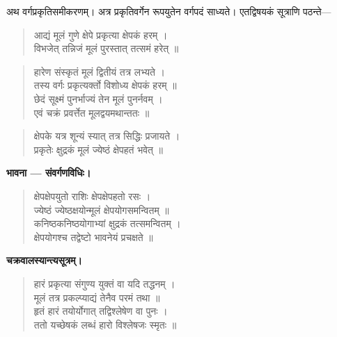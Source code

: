 \documentclass[11pt,a4paper]{article}
\newcommand{\dev}[1]{{\devanagarifont #1}}
\newcommand{\vs}{\vspace{0.5em}}
\newenvironment{sanskritverse}{%
  \begin{quote}\devanagarifont\textcolor{versecolor}%
}{%
  \end{quote}
}
\begin{document}
\lettrine[lines=3, lraise=0.1, nindent=0em, slope=-.5em]{\dev{अ}}{}थ वर्गप्रकृतिसमीकरणम्। अत्र प्रकृतिवर्गेन रूपयुतेन वर्गपदं साध्यते। एतद्विषयकं सूत्राणि पठन्ते---

\vs

\begin{sanskritverse}
\dev{आद्यं मूलं गुणे क्षेपे प्रकृत्या क्षेपकं हरम् ।}\\
\dev{विभजेत् तन्निजं मूलं पुरस्तात् तत्समं हरेत् ॥}
\end{sanskritverse}

\begin{sanskritverse}
\dev{हारेण संस्कृतं मूलं द्वितीयं तत्र लभ्यते ।}\\
\dev{तस्य वर्गः प्रकृत्यर्क्तो विशोध्य क्षेपकं हरम् ॥}\\
\dev{छेदं सूक्ष्मं पुनर्भाज्यं तेन मूलं पुनर्नवम् ।}\\
\dev{एवं चक्रं प्रवर्त्तेत मूलद्वयमथान्ततः ॥}
\end{sanskritverse}

\begin{sanskritverse}
\dev{क्षेपके यत्र शून्यं स्यात् तत्र सिद्धिः प्रजायते ।}\\
\dev{प्रकृतेः क्षुद्रकं मूलं ज्येष्ठं क्षेपहतं भवेत् ॥}
\end{sanskritverse}

\vs

\noindent\textbf{\dev{भावना --- संवर्गणविधिः।}}

\begin{sanskritverse}
\dev{क्षेपक्षेपयुतो राशिः क्षेपक्षेपहतो रसः ।}\\
\dev{ज्येष्ठं ज्येष्ठक्षयोन्मूलं क्षेपयोगसमन्वितम् ॥}\\
\dev{कनिष्ठकनिष्ठयोगाभ्यां क्षुद्रकं तत्समन्वितम् ।}\\
\dev{क्षेपयोगश्च तद्वेष्टो भावनेयं प्रचक्षते ॥}
\end{sanskritverse}

\vs

\noindent\textbf{\dev{चक्रवालस्यान्त्यसूत्रम्।}}

\begin{sanskritverse}
\dev{हारं प्रकृत्या संगुण्य युक्तं वा यदि तद्धनम् ।}\\
\dev{मूलं तत्र प्रकल्प्याद्यं तेनैव परमं तथा ॥}\\
\dev{हृतं हारं तयोर्योगात् तद्विश्लेषेण वा पुनः ।}\\
\dev{ततो यच्छेषकं लब्धं हारो विश्लेषजः स्मृतः ॥}
\end{sanskritverse}
\end{document}

